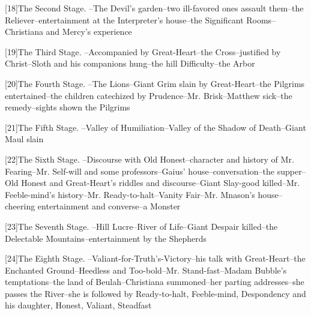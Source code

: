 [18]The Second Stage. --The Devil's garden--two ill-favored ones
assault them--the Reliever--entertainment at the Interpreter's
house--the Significant Rooms--Christiana and Mercy's experience

[19]The Third Stage. --Accompanied by Great-Heart--the Cross--justified
by Christ--Sloth and his companions hung--the hill Difficulty--the
Arbor

[20]The Fourth Stage. --The Lions--Giant Grim slain by Great-Heart--the
Pilgrims entertained--the children catechized by Prudence--Mr.
Brisk--Matthew sick--the remedy--sights shown the Pilgrims

[21]The Fifth Stage. --Valley of Humiliation--Valley of the Shadow of
Death--Giant Maul slain

[22]The Sixth Stage. --Discourse with Old Honest--character and history
of Mr. Fearing--Mr. Self-will and some professors--Gaius'
house--conversation--the supper--Old Honest and Great-Heart's riddles
and discourse--Giant Slay-good killed--Mr. Feeble-mind's history--Mr.
Ready-to-halt--Vanity Fair--Mr. Mnason's house--cheering entertainment
and converse--a Monster

[23]The Seventh Stage. --Hill Lucre--River of Life--Giant Despair
killed--the Delectable Mountains--entertainment by the Shepherds

[24]The Eighth Stage. --Valiant-for-Truth's-Victory--his talk with
Great-Heart--the Enchanted Ground--Heedless and Too-bold--Mr.
Stand-fast--Madam Bubble's temptations--the land of Beulah--Christiana
summoned--her parting addresses--she passes the River--she is followed
by Ready-to-halt, Feeble-mind, Despondency and his daughter, Honest,
Valiant, Steadfast
